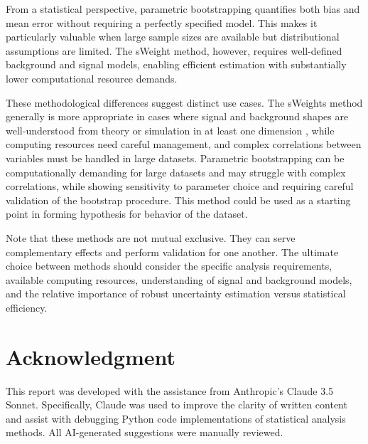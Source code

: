 \documentclass[a4paper, 12pt]{article}
\begin{document}
\par From a statistical perspective, parametric bootstrapping quantifies both bias and mean error without requiring a perfectly specified model. This makes it particularly valuable when large sample sizes are available but distributional assumptions are limited. The sWeight method, however, requires well-defined background and signal models, enabling efficient estimation with substantially lower computational resource demands. 
\par These methodological differences suggest distinct use cases. The sWeights method generally is more appropriate in cases where signal and background shapes are well-understood from theory or simulation in at least one dimension \cite{sweights2020}, while computing resources need careful management, and complex correlations between variables must be handled in large datasets. Parametric bootstrapping can be computationally demanding for large datasets and may struggle with complex correlations, while showing sensitivity to parameter choice and requiring careful validation of the bootstrap procedure. This method could be used as a starting point in forming hypothesis for behavior of the dataset. 
\par Note that these methods are not mutual exclusive. They can serve complementary effects and perform validation for one another. The ultimate choice between methods should consider the specific analysis requirements, available computing resources, understanding of signal and background models, and the relative importance of robust uncertainty estimation versus statistical efficiency.



\section{Acknowledgment}
\hspace{1.5em}This report was developed with the assistance from Anthropic's Claude 3.5 Sonnet. Specifically, Claude was used to improve the clarity of written content and assist with debugging Python code implementations of statistical analysis methods. All AI-generated suggestions were manually reviewed. 

\newpage

\end{document}
